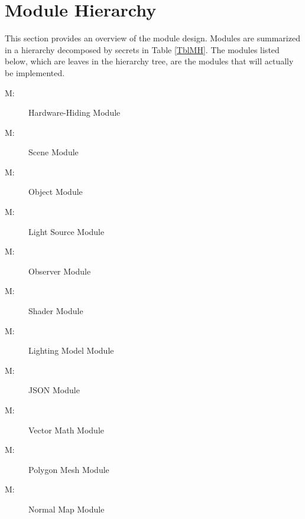 \documentclass[12pt, titlepage]{article}
\newcounter{mnum}
\newcommand{\mthemnum}{M\themnum}
\begin{document}
\section{Module Hierarchy} \label{SecMH}

This section provides an overview of the module design. Modules are summarized
in a hierarchy decomposed by secrets in Table \ref{TblMH}. The modules listed
below, which are leaves in the hierarchy tree, are the modules that will
actually be implemented.

\begin{description}
\item [ \mthemnum \label{mHH}:] Hardware-Hiding Module
\item [ \mthemnum \label{mScene}:] Scene Module
\item [ \mthemnum \label{mObject}:] Object Module
\item [ \mthemnum \label{mLights}:] Light Source Module
\item [ \mthemnum \label{mObsv}:] Observer Module
\item [ \mthemnum \label{mShade}:] Shader Module
\item [ \mthemnum \label{mLightModel}:] Lighting Model 
Module
\item [ \mthemnum \label{mJSON}:] JSON Module
\item [ \mthemnum \label{mVectors}:] Vector Math Module
\item [ \mthemnum \label{mMesh}:] Polygon Mesh Module
\item [ \mthemnum \label{mNormals}:] Normal Map Module
\end{description}
\end{document}
